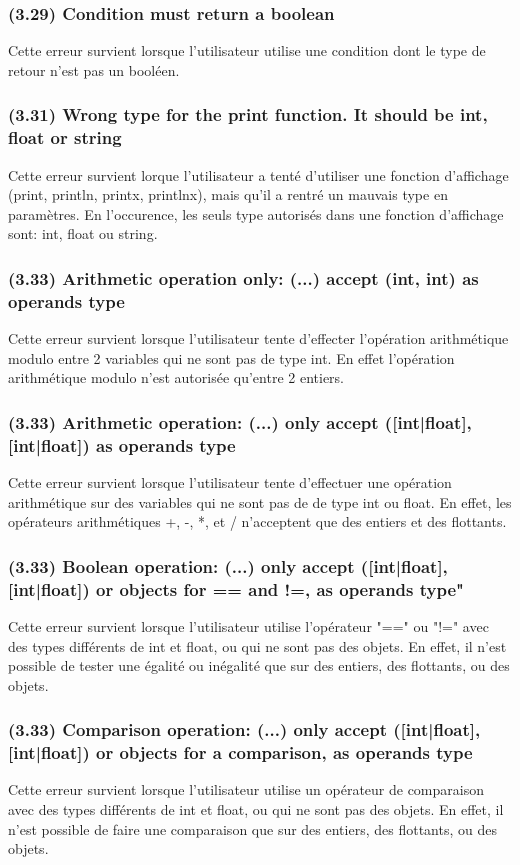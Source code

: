 \documentclass[12pt, a4paper, one side]{article}
\begin{document}
\subsubsection{(3.29) Condition must return a boolean}
Cette erreur survient lorsque l'utilisateur utilise une condition dont le type de retour n'est pas un booléen.

\subsubsection{(3.31) Wrong type for the print function. It should be int, float or string}
Cette erreur survient lorque l'utilisateur a tenté d'utiliser une fonction d'affichage (print, println, printx, printlnx),
mais qu'il a rentré un mauvais type en paramètres. En l'occurence, les seuls type autorisés dans une
fonction d'affichage sont: int, float ou string.

\subsubsection{(3.33) Arithmetic operation only: (...) accept (int, int) as operands type}
Cette erreur survient lorsque l'utilisateur tente d'effecter l'opération arithmétique modulo entre 2 variables qui ne sont pas de type int. En effet l'opération arithmétique modulo n'est autorisée qu'entre 2 entiers.

\subsubsection{(3.33) Arithmetic operation: (...) only accept ([int|float], [int|float]) as operands type}
Cette erreur survient lorsque l'utilisateur tente d'effectuer une opération arithmétique sur des variables qui ne sont pas de de type int ou float. En effet, les opérateurs arithmétiques +, -, *, et / n'acceptent que des entiers et des flottants.

\subsubsection{(3.33) Boolean operation: (...) only accept ([int|float], [int|float]) or objects for == and !=, as operands type"}
Cette erreur survient lorsque l'utilisateur utilise l'opérateur "==" ou "!=" avec des types différents de int et float, ou qui ne sont pas des objets. En effet, il n'est possible de tester une égalité ou inégalité que sur des entiers, des flottants, ou des objets.

\subsubsection{(3.33) Comparison operation: (...) only accept ([int|float], [int|float]) or objects for a comparison, as operands type}
Cette erreur survient lorsque l'utilisateur utilise un opérateur de comparaison avec des types différents de int et float, ou qui ne sont pas des objets. En effet, il n'est possible de faire une comparaison que sur des entiers, des flottants, ou des objets.
\end{document}
